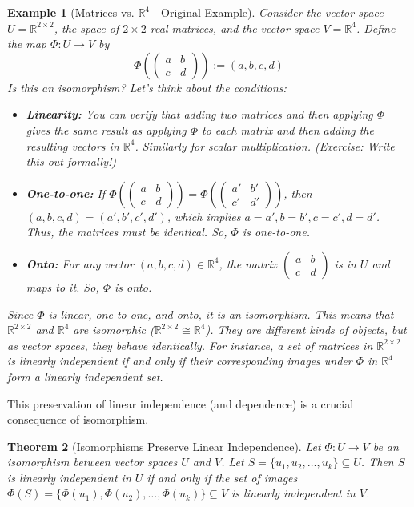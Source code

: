 \documentclass[11pt]{article}
\newtheorem{theorem}{Theorem}[section]
\newtheorem{example}[theorem]{Example}
\theoremstyle{definition}
\theoremstyle{remark}
\newcommand{\R}{\mathbb{R}}
\newcommand{\mat}[1]{\begin{pmatrix}#1\end{pmatrix}}
\begin{document}
\begin{example}[Matrices vs. $\R^4$ - Original Example] \label{ex:matrix_iso}
Consider the vector space $U = \R^{2 \times 2}$, the space of $2 \times 2$ real matrices, and the vector space $V = \R^4$. Define the map $\Phi: U \to V$ by
\[ \Phi\left( \mat{a & b \\ c & d} \right) := (a, b, c, d) \]
Is this an isomorphism? Let's think about the conditions:
\begin{itemize}
    \item \textbf{Linearity:} You can verify that adding two matrices and then applying $\Phi$ gives the same result as applying $\Phi$ to each matrix and then adding the resulting vectors in $\R^4$. Similarly for scalar multiplication. (Exercise: Write this out formally!)
    \item \textbf{One-to-one:} If $\Phi\left( \mat{a & b \\ c & d} \right) = \Phi\left( \mat{a' & b' \\ c' & d'} \right)$, then $(a, b, c, d) = (a', b', c', d')$, which implies $a=a', b=b', c=c', d=d'$. Thus, the matrices must be identical. So, $\Phi$ is one-to-one.
    \item \textbf{Onto:} For any vector $(a, b, c, d) \in \R^4$, the matrix $\mat{a & b \\ c & d}$ is in $U$ and maps to it. So, $\Phi$ is onto.
\end{itemize}
Since $\Phi$ is linear, one-to-one, and onto, it is an isomorphism. This means that $\R^{2 \times 2}$ and $\R^4$ are isomorphic ($ \R^{2 \times 2} \cong \R^4 $). They are different kinds of objects, but as vector spaces, they behave identically. For instance, a set of matrices in $\R^{2 \times 2}$ is linearly independent if and only if their corresponding images under $\Phi$ in $\R^4$ form a linearly independent set.
\end{example}

This preservation of linear independence (and dependence) is a crucial consequence of isomorphism.

\begin{theorem}[Isomorphisms Preserve Linear Independence] \label{thm:iso_preserves_li}
Let $\Phi: U \to V$ be an isomorphism between vector spaces $U$ and $V$. Let $S = \{u_1, u_2, \dots, u_k\} \subseteq U$. Then $S$ is linearly independent in $U$ if and only if the set of images $\Phi(S) = \{\Phi(u_1), \Phi(u_2), \dots, \Phi(u_k)\} \subseteq V$ is linearly independent in $V$.
\end{theorem}
\end{document}
